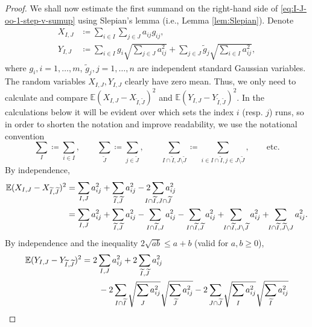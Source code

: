 \documentclass[a4paper]{amsart}
\theoremstyle{definition}
\theoremstyle{remark}
\numberwithin{equation}{section}
\newcommand*{\EE}{\mathbb{E}}
\begin{document}
\begin{proof}
We shall now estimate the first summand on the right-hand side of \eqref{eq:I-J-oo-1-step-v-sumup} using  Slepian's lemma (i.e., Lemma \ref{lem:Slepian}).
Denote
\begin{align*}
	X_{I,J} &\coloneqq \sum_{i\in I} \sum_{j\in J} a_{ij} g_{ij},\\
	Y_{I,J} &\coloneqq \sum_{i\in I} g_i \sqrt{\sum_{j\in J} a_{ij}^2 }
	                   + \sum_{j\in J} \widetilde{g}_j \sqrt{\sum_{i\in I} a_{ij}^2 },
\end{align*}
where $g_i, i=1,\ldots,m$, $ \widetilde{g}_j, j=1,\ldots,n$ are independent standard Gaussian variables.
The random variables $X_{I,J}, Y_{I,J}$ clearly have zero mean.
Thus,
we only need to calculate and compare $\EE (X_{I,J} - X_{\widetilde{I}, \widetilde{J}})^2$ and $\EE (Y_{I,J} - Y_{\widetilde{I}, \widetilde{J}})^2$.
In the calculations below it will be evident
over which sets the index $i$ (resp. $j$) runs,
so in order to shorten the notation and improve readability,
we use the notational convention
\[
\sum_{I} \coloneqq \sum_{i\in I},
\qquad \sum_{\widetilde{J}} \coloneqq \sum_{j\in\widetilde{J}},
\qquad
\sum_{I\cap \widetilde{I}, J\setminus\widetilde{J}}\coloneqq
\sum_{{i\in I\cap \widetilde{I}, j\in J\setminus\widetilde{J}}},
\qquad \text{etc.}
\]
By independence,
\begin{align*}
\EE (X_{I,J} - X_{\widetilde{I}, \widetilde{J}})^2
 &=  \sum_{I, J} a_{ij}^2
 + \sum_{\widetilde{I},  \widetilde{J}} a_{ij}^2
 - 2 \sum_{\mathclap{I\cap \widetilde{I}, J\cap \widetilde{J}} } a_{ij}^2\\
    &= \sum_{I, J} a_{ij}^2
   + \sum_{\widetilde{I},\widetilde{J}} a_{ij}^2
   -  \sum_{{I\cap \widetilde{I}, J}} a_{ij}^2
   -   \sum_{{I\cap \widetilde{I},\widetilde{J}} } a_{ij}^2  + \!\! \sum_{{I\cap \widetilde{I}, J\setminus\widetilde{J}}} a_{ij}^2
   +\!\! \sum_{{I\cap \widetilde{I},\widetilde{J}\setminus J}} a_{ij}^2.
\end{align*}
By independence and the inequality $2\sqrt{ab} \le a+b$ (valid for $a,b\geq 0$),
\begin{align*}
	\EE (Y_{I,J} - Y_{\widetilde{I}, \widetilde{J}})^2
	&= 2\sum_{I, J} a_{ij}^2
	+ 2\sum_{\widetilde{I}, \widetilde{J}} a_{ij}^2\\
	&\qquad 	
	- 2 \sum_{I\cap \widetilde{I}} \sqrt{\sum_{ J \vphantom{\widetilde{J} -- cludge for moving position of limit down}} a_{ij}^2}\sqrt{\sum_{ \widetilde{J} } a_{ij}^2}
	- 2 \sum_{J\cap \widetilde{J}} \sqrt{\sum_{I \vphantom{\widetilde{I} -- cludge for moving position of limit down}} a_{ij}^2}\sqrt{\sum_{\widetilde{I} } a_{ij}^2}\\

\end{align*}
\end{proof}
\end{document}
